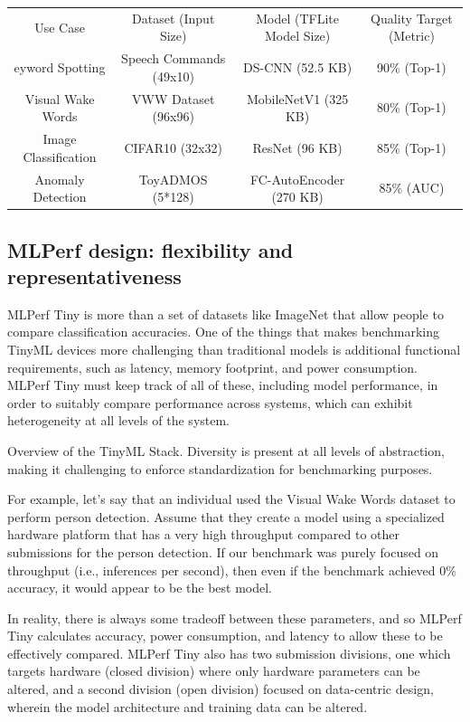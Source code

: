 {{{{{{{{    \begin{tabular}{cccc}
    Use Case	&    Dataset    (Input Size)&   Model   (TFLite Model Size)&    Quality Target   (Metric)\\
    eyword Spotting&	Speech Commands (49x10)	&DS-CNN (52.5 KB)&	90\% (Top-1)\\
    Visual Wake Words&	VWW Dataset (96x96)	&MobileNetV1 (325 KB)&	80\% (Top-1)\\
    Image Classification&	CIFAR10 (32x32)&	ResNet (96 KB)&	85\% (Top-1)\\
    Anomaly Detection&	ToyADMOS (5*128)&	FC-AutoEncoder (270 KB)&	85\% (AUC)\\
\end{tabular}
    
    \subsection{MLPerf design: flexibility and representativeness}
    
    MLPerf Tiny is more than a set of datasets like ImageNet that allow people to compare classification accuracies. One of the things that makes benchmarking TinyML devices more challenging than traditional models is additional functional requirements, such as latency, memory footprint, and power consumption. MLPerf Tiny must keep track of all of these, including model performance, in order to suitably compare performance across systems, which can exhibit heterogeneity at all levels of the system.
    
    
    Overview of the TinyML Stack. Diversity is present at all levels of abstraction, making it challenging to enforce standardization for benchmarking purposes.
    
    For example, let’s say that an individual used the Visual Wake Words dataset to perform person detection. Assume that they create a model using a specialized hardware platform that has a very high throughput compared to other submissions for the person detection. If our benchmark was purely focused on throughput (i.e., inferences per second), then even if the benchmark achieved 0\% accuracy, it would appear to be the best model. 
    
    In reality, there is always some tradeoff between these parameters, and so MLPerf Tiny calculates accuracy, power consumption, and latency to allow these to be effectively compared. MLPerf Tiny also has two submission divisions, one which targets hardware (closed division) where only hardware parameters can be altered, and a second division (open division) focused on data-centric design, wherein the model architecture and training data can be altered.
    
}}}}}}}}
